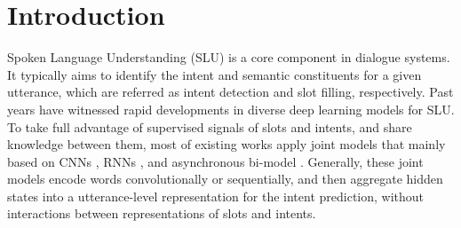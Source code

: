 \documentclass[11pt,a4paper]{article}
\begin{document}
\begin{table*}[t!]
\begin{center}
\end{center}
\caption{Examples in SNIPS with annotations of intent label for the utterance and slot tags for partial words.}
\label{cases}
\end{table*}

\section{Introduction}
Spoken Language Understanding (SLU) is a core component in dialogue systems. It typically aims to identify the intent and semantic constituents for a given utterance, which are referred as intent detection and slot filling, respectively. 
Past years have witnessed rapid developments in diverse deep learning models \cite{dl_2003,dl_2011} for SLU. To take full advantage of supervised signals of slots and intents, and share knowledge between them, most of existing works apply joint models that mainly based on CNNs \cite{cnn_joint_2013,simple_fast_2019}, RNNs \cite{recursive_joint_2014,attention_liu_2016}, and asynchronous bi-model \cite{bi_model_2018}.
Generally, these joint models encode words convolutionally or sequentially, and then aggregate hidden states into a utterance-level representation for the intent prediction, without interactions between representations of slots and intents.
\end{document}
